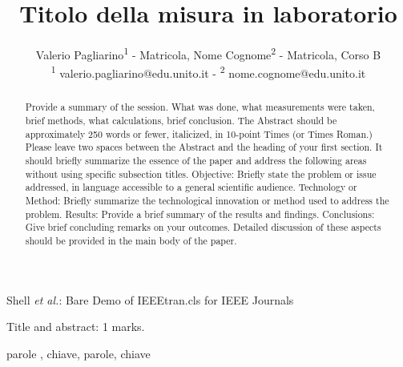 \documentclass[journal]{IEEEtran}
\begin{document}
\title{Titolo della misura in laboratorio\\ 
}

\author{Valerio Pagliarino\textsuperscript{1}
        - Matricola,
        Nome Cognome\textsuperscript{2}
        - Matricola,
        {\small  Corso B\\
        \textsuperscript{1}
        valerio.pagliarino@edu.unito.it  -
        \textsuperscript{2}
        nome.cognome@edu.unito.it
        }}%
        
{Shell \MakeLowercase{\textit{et al.}}: Bare Demo of IEEEtran.cls for IEEE Journals}

\maketitle

\begin{flushright} Title and abstract: 1 marks. \end{flushright}
\begin{abstract} Provide a summary of the session. What was done, 
what measurements were taken, brief methods, what calculations, brief conclusion.  The Abstract should be approximately 250 words or fewer, italicized, in 10-point Times (or Times Roman.) Please leave two spaces between the Abstract and the heading of your first section.
It should briefly summarize the essence of the paper and address the following areas without using specific subsection titles. Objective: Briefly state the problem or issue addressed, in language accessible to a general scientific audience. Technology or Method: Briefly summarize the technological innovation or method used to address the problem. Results: Provide a brief summary of the results and findings. Conclusions: Give brief concluding remarks on your outcomes. Detailed discussion of these aspects should be provided in the main body of the paper. 
\end{abstract}

\begin{IEEEkeywords}
parole , chiave, parole, chiave
\end{IEEEkeywords}
\end{document}
